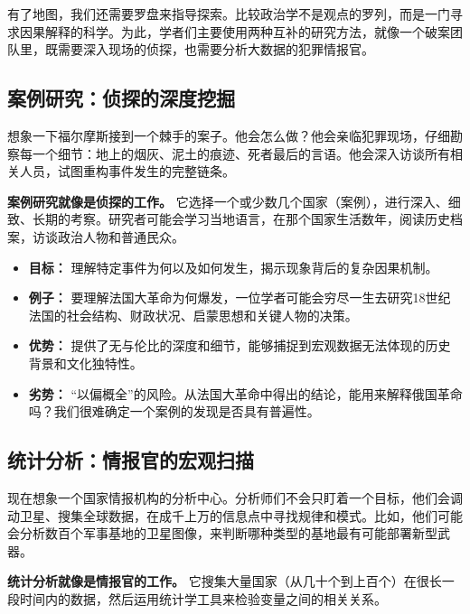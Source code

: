 \documentclass[a5paper, 11pt, openany]{ctexbook}
\begin{document}
有了地图，我们还需要罗盘来指导探索。比较政治学不是观点的罗列，而是一门寻求因果解释的科学。为此，学者们主要使用两种互补的研究方法，就像一个破案团队里，既需要深入现场的侦探，也需要分析大数据的犯罪情报官。

\subsection{案例研究：侦探的深度挖掘}

想象一下福尔摩斯接到一个棘手的案子。他会怎么做？他会亲临犯罪现场，仔细勘察每一个细节：地上的烟灰、泥土的痕迹、死者最后的言语。他会深入访谈所有相关人员，试图重构事件发生的完整链条。

\textbf{案例研究就像是侦探的工作。} 它选择一个或少数几个国家（案例），进行深入、细致、长期的考察。研究者可能会学习当地语言，在那个国家生活数年，阅读历史档案，访谈政治人物和普通民众。

\begin{itemize}
    \item \textbf{目标：} 理解特定事件为何以及如何发生，揭示现象背后的复杂因果机制。
    \item \textbf{例子：} 要理解法国大革命为何爆发，一位学者可能会穷尽一生去研究18世纪法国的社会结构、财政状况、启蒙思想和关键人物的决策。
    \item \textbf{优势：} 提供了无与伦比的深度和细节，能够捕捉到宏观数据无法体现的历史背景和文化独特性。
    \item \textbf{劣势：} “以偏概全”的风险。从法国大革命中得出的结论，能用来解释俄国革命吗？我们很难确定一个案例的发现是否具有普遍性。
\end{itemize}

\subsection{统计分析：情报官的宏观扫描}

现在想象一个国家情报机构的分析中心。分析师们不会只盯着一个目标，他们会调动卫星、搜集全球数据，在成千上万的信息点中寻找规律和模式。比如，他们可能会分析数百个军事基地的卫星图像，来判断哪种类型的基地最有可能部署新型武器。

\textbf{统计分析就像是情报官的工作。} 它搜集大量国家（从几十个到上百个）在很长一段时间内的数据，然后运用统计学工具来检验变量之间的相关关系。
\end{document}
